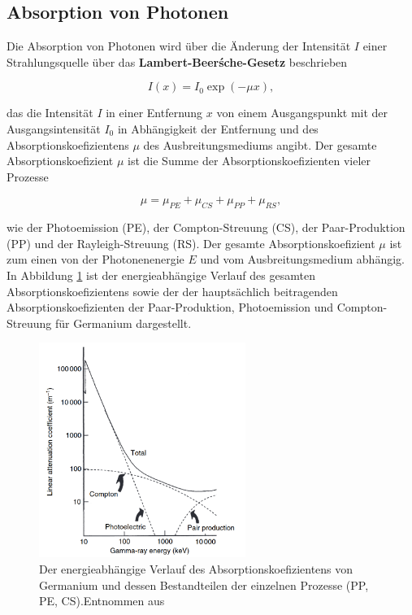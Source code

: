       \subsection{Absorption von Photonen}
        Die Absorption von Photonen wird über die Änderung der Intensität $I$ einer Strahlungsquelle über das \textbf{Lambert-Beerśche-Gesetz} beschrieben

        \begin{equation}
          I(x) = I_0 \exp\left(-\mu x\right),
        \label{eqn:absorptionsgesetz}
        \end{equation}

        das die Intensität $I$ in einer Entfernung $x$ von einem Ausgangspunkt mit der Ausgangsintensität $I_0$ in Abhängigkeit der Entfernung und des Absorptionskoefizientens $\mu$ des Ausbreitungsmediums 
        angibt. Der gesamte Absorptionskoefizient $\mu$ ist die Summe der Absorptionskoefizienten vieler Prozesse
        
        \begin{equation*}
          \mu = \mu_{PE} + \mu_{CS} + \mu_{PP} + \mu_{RS},
        \end{equation*}

        wie der Photoemission (PE), der Compton-Streuung (CS), der Paar-Produktion (PP) und der Rayleigh-Streuung (RS). Der gesamte Absorptionskoefizient $\mu$ ist zum einen von der Photonenenergie $E$ und 
        vom Ausbreitungsmedium abhängig. In Abbildung \ref{fig:absorptionskoeffizient} ist der energieabhängige Verlauf des gesamten Absorptionskoefizientens sowie der der hauptsächlich beitragenden 
        Absorptionskoefizienten der Paar-Produktion, Photoemission und Compton-Streuung für Germanium dargestellt. 

        \FloatBarrier

        \begin{figure}[h]
          \centering
          \includegraphics[width = 0.6\textwidth]{pictures/absorptionskoeffizient.png}
          \caption{Der energieabhängige Verlauf des Absorptionskoefizientens von Germanium und dessen Bestandteilen der einzelnen Prozesse (PP, PE, CS).Entnommen aus \cite{gilmore_practical_2008}}
          \label{fig:absorptionskoeffizient}
        \end{figure}

